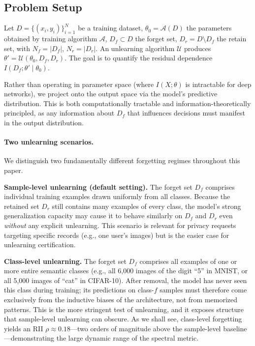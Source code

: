 \documentclass[journal]{IEEEtran}
\theoremstyle{definition}
\begin{document}
\subsection{Problem Setup}

Let $D = \{(x_i, y_i)\}_{i=1}^N$ be a training dataset, $\theta_0 = \mathcal{A}(D)$ the parameters obtained by training algorithm $\mathcal{A}$, $D_f \subset D$ the forget set, $D_r = D \setminus D_f$ the retain set, with $N_f = |D_f|$, $N_r = |D_r|$. An unlearning algorithm $\mathcal{U}$ produces $\theta' = \mathcal{U}(\theta_0, D_f, D_r)$. The goal is to quantify the residual dependence $I(D_f; \theta' \mid \theta_0)$.

Rather than operating in parameter space (where $I(X;\theta)$ is intractable for deep networks), we project onto the output space via the model's predictive distribution. This is both computationally tractable and information-theoretically principled, as any information about $D_f$ that influences decisions must manifest in the output distribution.

\paragraph{Two unlearning scenarios.}
We distinguish two fundamentally different forgetting regimes throughout this paper.

\noindent\textbf{Sample-level unlearning (default setting).} The forget set $D_f$ comprises individual training examples drawn uniformly from all classes. Because the retained set $D_r$ still contains many examples of every class, the model's strong generalization capacity may cause it to behave similarly on $D_f$ and $D_r$ even \emph{without} any explicit unlearning. This scenario is relevant for privacy requests targeting specific records (e.g., one user's images) but is the easier case for unlearning certification.

\noindent\textbf{Class-level unlearning.} The forget set $D_f$ comprises all examples of one or more entire semantic classes (e.g., all 6,000 images of the digit ``5'' in MNIST, or all 5,000 images of ``cat'' in CIFAR-10). After removal, the model has never seen this class during training; its predictions on class-$f$ samples must therefore come exclusively from the inductive biases of the architecture, not from memorized patterns. This is the more stringent test of unlearning, and it exposes structure that sample-level unlearning can obscure. As we shall see, class-level forgetting yields an RII $\rho \approx 0.18$---two orders of magnitude above the sample-level baseline---demonstrating the large dynamic range of the spectral metric.
\end{document}

